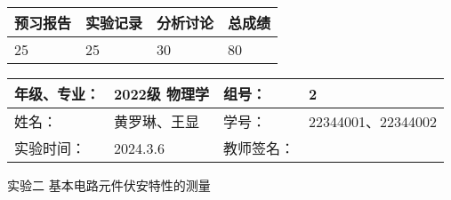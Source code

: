 \documentclass[dvipsnames, svgnames,a4paper,11pt]{article}
\begin{document}
	
	
	
	
	\begin{table}
		\renewcommand\arraystretch{1.7}
		\begin{tabularx}{\textwidth}{
				|X|X|X|X
				|X|X|X|X|}
			\hline
			\multicolumn{2}{|c|}{预习报告}&\multicolumn{2}{|c|}{实验记录}&\multicolumn{2}{|c|}{分析讨论}&\multicolumn{2}{|c|}{总成绩}\\
			\hline
			\LARGE25 & & \LARGE25 & & \LARGE30 & & \LARGE80 & \\
			\hline
		\end{tabularx}
	\end{table}
	
	\begin{table}
		\renewcommand\arraystretch{1.7}
		\begin{tabularx}{\textwidth}{|X|X|X|X|}
			\hline
			年级、专业： & 2022级 物理学 &组号： & 2\\
			\hline
			姓名： & 黄罗琳、王显 & 学号： & 22344001、22344002\\
			\hline
			实验时间： & 2024.3.6 & 教师签名： & \\
			\hline
		\end{tabularx}
	\end{table}
	
	\begin{center}
		\LARGE 实验二  \quad 基本电路元件伏安特性的测量
	\end{center}
	
	
\end{document}
